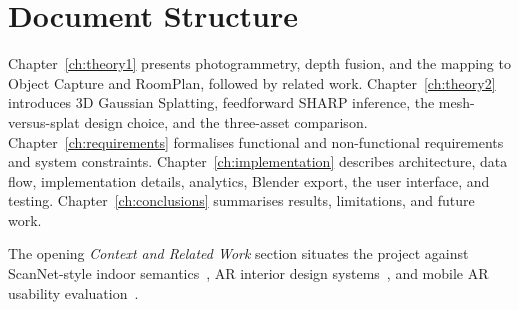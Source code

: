 \section{Document Structure}

Chapter~\ref{ch:theory1} presents photogrammetry, depth fusion, and the mapping to Object Capture and RoomPlan, followed by related work. Chapter~\ref{ch:theory2} introduces 3D Gaussian Splatting, feedforward SHARP inference, the mesh-versus-splat design choice, and the three-asset comparison. Chapter~\ref{ch:requirements} formalises functional and non-functional requirements and system constraints. Chapter~\ref{ch:implementation} describes architecture, data flow, implementation details, analytics, Blender export, the user interface, and testing. Chapter~\ref{ch:conclusions} summarises results, limitations, and future work.

The opening \textit{Context and Related Work} section situates the project against ScanNet-style indoor semantics~\cite{dai2017scannet}, AR interior design systems~\cite{kan2021ar}, and mobile AR usability evaluation~\cite{kandil2021ux}.
